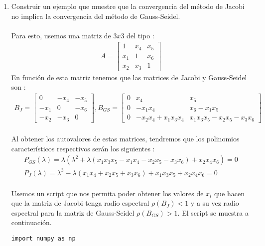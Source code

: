 \documentclass{article}
\begin{document}
\begin{enumerate}

\item Construir un ejemplo que muestre que la convergencia del m\'etodo de Jacobi no implica la convergencia del m\'etodo de Gauss-Seidel.
\\
\\
Para esto, usemos una matriz de $3x3$ del tipo :
\begin{gather*}
A = 
\begin{bmatrix}
	     1 	 & x_{4} &  x_{5} \\
	   x_{1} &   1   &  x_{6} \\
	   x_{2} & x_{3} & 	  1  
\end{bmatrix}
\end{gather*}
En funci\'on de esta matriz tenemos que las matrices de Jacobi y Gauss-Seidel son :
\begin{gather*}
B_{J} = 
\begin{bmatrix}
		0	 &  -x_{4}	& -x_{5} \\
	  -x_{1} & 	   0	& -x_{6} \\
	  -x_{2} & 	-x_{3}  &    0
\end{bmatrix},
B_{GS} = 
\begin{bmatrix}
	0	&				x_{4}			&	x_{5} \\
    0	& 			-x_{1}x_{4}			& x_{6} - x_{1}x_{5} \\
    0	& -x_{2}x_{4} + x_{1}x_{3}x_{4} & x_{1}x_{3}x_{5} - x_{2}x_{5} - x_{3}x_{6}
\end{bmatrix}
\end{gather*}
\\
Al obtener los autovalores de estas matrices, tendremos que los polinomios caracter\'isticos respectivos ser\'an los siguientes :
\begin{gather*}
P_{GS}(\lambda) = \lambda ( \lambda^{2} + \lambda ( x_{1}x_{3}x_{5} - x_{1}x_{4} - x_{2}x_{5} - x_{3}x_{6} ) + x_{2}x_{4}x_{6} ) = 0 \\
P_{J}(\lambda) = \lambda^{3} - \lambda( x_{1}x_{4} + x_{2}x_{5} + x_{3}x_{6} ) + x_{1}x_{3}x_{5} + x_{2}x_{4}x_{6} = 0
\end{gather*}
\\
Usemos un script que nos permita poder obtener los valores de $x_{i}$ que hacen que la matriz de Jacobi tenga radio espectral $\rho(B_{J}) < 1$ y a su vez radio espectral para la matriz de Gauss-Seidel $\rho(B_{GS}) > 1$. El script se muestra a continuaci\'on.
\\
\lstset{language=Python}
\begin{lstlisting}[frame=single]
import numpy as np


\end{lstlisting}
\end{enumerate}
\end{document}
